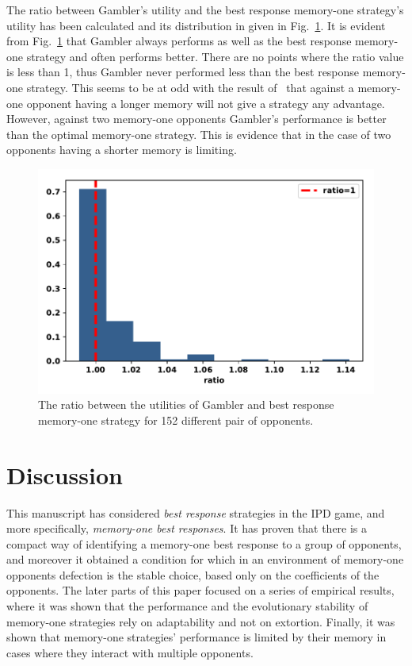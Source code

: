 \documentclass[10pt]{article}
\begin{document}
The ratio between Gambler's utility and the best response memory-one strategy's utility has been calculated and its distribution in
given in Fig.~\ref{fig:utilities_gambler_mem_one}.
It is evident from Fig.~\ref{fig:utilities_gambler_mem_one} that
Gambler always performs as well as the best response memory-one strategy and often performs better. There are
no points where the ratio value is less than 1, thus Gambler never performed less
than the best response memory-one strategy. This seems to be at odd with the
result of~\cite{Press2012} that against a memory-one opponent having a longer memory
will not give a strategy any
advantage. However, against two memory-one opponents Gambler's performance is better than
the optimal memory-one strategy. This is evidence that in the case of two opponents having a
shorter memory is limiting.

\begin{figure}[!htbp]
    \centering
    \includegraphics[width=.5\textwidth]{img/gambler_performance_against_mem_one.pdf}
    \caption{The ratio between the utilities of Gambler and best response memory-one
    strategy for 152 different pair of opponents.}\label{fig:utilities_gambler_mem_one}
\end{figure}

\section{Discussion}
This manuscript has considered \textit{best response} strategies in the IPD game, and
more specifically, \textit{memory-one best responses}. It has proven that there is
a compact way of identifying a memory-one best response to a group of opponents,
and moreover it obtained a condition for which in an
environment of memory-one opponents defection is the stable choice, based only
on the coefficients of the opponents.
The later parts of this paper focused on a series of empirical results, where it
was shown that the performance and the evolutionary stability of memory-one
strategies rely on adaptability and not on extortion. Finally, it was shown that
memory-one strategies' performance is limited by their memory in cases where
they interact with multiple opponents.
\end{document}
